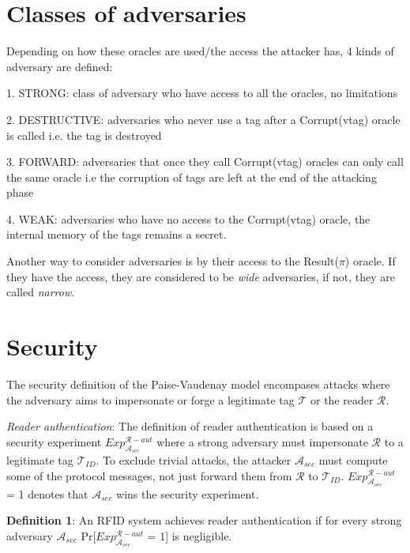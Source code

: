     \vspace{0.3cm}
    \section{Classes of adversaries}
    \hspace{0.5cm}
    Depending on how these oracles are used/the access the attacker has, 4 kinds of adversary are defined:
    
    1. STRONG: class of adversary who have access to all the oracles, no limitations

    2. DESTRUCTIVE: adversaries who never use a tag after a Corrupt(vtag) oracle is called
        i.e. the tag is destroyed

    3. FORWARD: adversaries that once they call Corrupt(vtag) oracles can only call the same oracle
        i.e the corruption of tags are left at the end of the attacking phase

    4. WEAK: adversaries who have no access to the Corrupt(vtag) oracle, the internal memory of the tags remains a secret. 

    Another way to consider adversaries is by their access to the Result($\pi$) oracle. If they have the access, they are considered to be
        \textit{wide} adversaries, if not, they are called \textit{narrow}.

    \section{Security}

    \hspace*{0.4cm} 
    The security definition of the Paise-Vaudenay model\cite{PV model} encompases attacks where the adversary aims to impersonate or forge a legitimate tag 
    $\mathcal{T}$ or the reader $\mathcal{R}$. 

    \textit{Reader authentication}: The definition of reader authentication is based on a security experiment $Exp_{\mathcal{A}_{sec}}^{\mathcal{R}-aut}$
    where a strong adversary must impersonate $\mathcal{R}$ to a legitimate tag $\mathcal{T}_{ID}$. To exclude trivial attacks, the attacker $\mathcal{A}_{sec}$
    must compute some of the protocol messages, not just forward them from $\mathcal{R}$ to $\mathcal{T}_{ID}$. $Exp_{\mathcal{A}_{sec}}^{\mathcal{R}-aut}$ = 1
    denotes that $\mathcal{A}_{sec}$ wins the security experiment.

    \textbf{Definition 1}: An RFID system achieves reader authentication if for every strong adversary $\mathcal{A}_{sec}$ Pr[$Exp_{\mathcal{A}_{sec}}^{\mathcal{R}-aut}$ = 1]
    is negligible.

